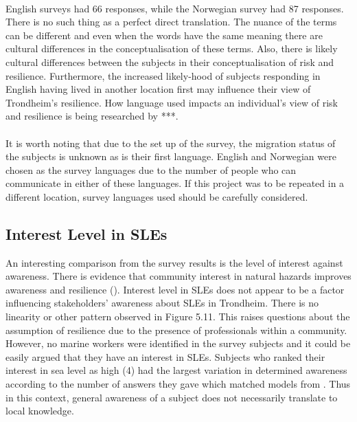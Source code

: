 \paragraph{}
English surveys had 66 responses, while the Norwegian survey had 87 responses. There is no such thing as a perfect direct translation. The nuance of the terms can be different and even when the words have the same meaning there are cultural differences in the conceptualisation of these terms. Also, there is likely cultural differences between the subjects in their conceptualisation of risk and resilience. Furthermore, the increased likely-hood of subjects responding in English having lived in another location first may influence their view of Trondheim's resilience. How language used impacts an individual's view of risk and resilience is being researched by ***.

\paragraph{}
It is worth noting that due to the set up of the survey, the migration status of the subjects is unknown as is their first language. English and Norwegian were chosen as the survey languages due to the number of people who can communicate in either of these languages. If this project was to be repeated in a different location, survey languages used should be carefully considered.


\subsection{Interest Level in SLEs}
 An interesting comparison from the survey results is the level of interest against awareness. There is evidence that community interest in natural hazards improves awareness and resilience (\cite{cutter_community_2020}). Interest level in SLEs does not appear to be a factor influencing stakeholders' awareness about SLEs in Trondheim. There is no linearity or other pattern observed in Figure 5.11. This raises questions about the assumption of resilience due to the presence of professionals within a community. However, no marine workers were identified in the survey subjects and it could be easily argued that they have an interest in SLEs. Subjects who ranked their interest in sea level as high (4) had the largest variation in determined awareness according to the number of answers they gave which matched models from \cite{kartverket_se_2020}. Thus in this context, general awareness of a subject does not necessarily translate to local knowledge.
